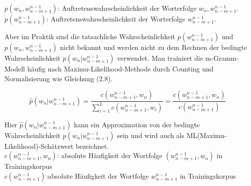 $p(w_{n},w_{n-m+1}^{n-1})$: Auftretenswahrscheinlichkeit der Worterfolge $w_{n},w_{n-m+1}^{n-1}$.
$p(w_{n-m+1}^{n-1})$: Auftretenswahrscheinlichkeit der Worterfolge $w_{n-m+1}^{n-1}$.


Aber im Praktik sind die tatsachliche Wahrscheinlichkeit $p(w_{n-m+1}^{n-1})$  und $p(w_{n},w_{n-m+1}^{n-1})$ nicht bekannt und werden nicht zu dem Rechnen der bedingte Wahrscheinlichkeit $p(w_{n}|w_{n-m+1}^{n-1})$ verwendet. Man trainiert die m-Gramm-Modell h\"aufig nach Maximu-Likelihood-Methode \cite{int_MLE} durch Counting und Normalisierung wie Gleichung (2.8). 

\begin{equation}
\hat{p}(w_{n}|w_{n-m+1}^{n-1})=\frac{c(w_{n-m+1}^{n-1},w_{n} )}{ \sum_{i=1}^L c(w_{n-m+1}^{n-1},w_{i})}=\frac{c(w_{n-m+1}^{n-1},w_{n} )}{c(w_{n-m+1}^{n-1})}
\end{equation}

Hier $\hat{p}(w_{n}|w_{n-m+1}^{n-1})$ kann ein Approximation von der bedingte Wahrscheinlichkeit $p(w_{n}|w_{n-m+1}^{n-1})$ sein und wird auch als ML(Maximu-Likelihood)-Sch\"atzwert bezeichnet.\\
$c(w_{n-m+1}^{n-1},w_{n})$: absolute H\"aufigkeit der Wortfolge $(w_{n-m+1}^{n-1},w_{n})$ in Trainingskorpus\\
$c(w_{n-m+1}^{n-1})$:absolute H\"aufigkeit der Wortfolge $w_{n-m+1}^{n-1}$ in Trainingskorpus\\

\cite{ars_script}
\cite{int_MLE}
\cite{folie_script}
\cite{int_entropie}
